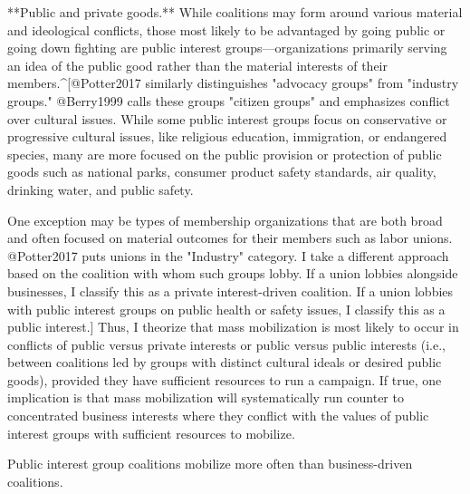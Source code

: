 \begin{subhyp}

**Public and private goods.** While coalitions may form around various material and ideological conflicts, those most likely to be advantaged by going public or going down fighting are public interest groups---organizations primarily serving an idea of the public good rather than the material interests of their members.^[@Potter2017 similarly distinguishes "advocacy groups" from "industry groups." @Berry1999 calls these groups "citizen groups" and emphasizes conflict over cultural issues. While some public interest groups focus on conservative or progressive cultural issues, like religious education, immigration, or endangered species, many are more focused on the public provision or protection of public goods such as national parks, consumer product safety standards, air quality, drinking water, and public safety.

One exception may be types of membership organizations that are both broad and often focused on material outcomes for their members such as labor unions. @Potter2017 puts unions in the "Industry" category. I take a different approach based on the coalition with whom such groups lobby. If a union lobbies alongside businesses, I classify this as a private interest-driven coalition. If a union lobbies with public interest groups on public health or safety issues, I classify this as a public interest.] Thus, I theorize that mass mobilization is most likely to occur in conflicts of public versus private interests or public versus public interests (i.e., between coalitions led by groups with distinct cultural ideals or desired public goods), provided they have sufficient resources to run a campaign.
If true, one implication is that mass mobilization will systematically run counter to concentrated business interests where they conflict with the values of public interest groups with sufficient resources to mobilize.


\begin{hyp} \label{hyp:publicinterest}
Public interest group coalitions mobilize more often than business-driven coalitions.
\end{hyp}


\end{subhyp}
